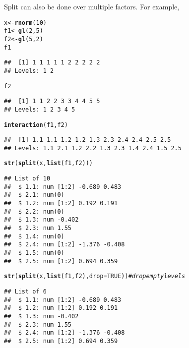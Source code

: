 \documentclass[12pt, a4paper, oneside]{article}\usepackage[]{graphicx}\usepackage[]{color}
\makeatletter
\newcommand{\hlnum}[1]{\textcolor[rgb]{0.686,0.059,0.569}{#1}}%
\newcommand{\hlcom}[1]{\textcolor[rgb]{0.678,0.584,0.686}{\textit{#1}}}%
\newcommand{\hlstd}[1]{\textcolor[rgb]{0.345,0.345,0.345}{#1}}%
\newcommand{\hlkwb}[1]{\textcolor[rgb]{0.69,0.353,0.396}{#1}}%
\newcommand{\hlkwc}[1]{\textcolor[rgb]{0.333,0.667,0.333}{#1}}%
\newcommand{\hlkwd}[1]{\textcolor[rgb]{0.737,0.353,0.396}{\textbf{#1}}}%
\newenvironment{kframe}{%
 \def\at@end@of@kframe{}%
 \ifinner\ifhmode%
  \def\at@end@of@kframe{\end{minipage}}%
  \begin{minipage}{\columnwidth}%
 \fi\fi%
 \def\FrameCommand##1{\hskip\@totalleftmargin \hskip-\fboxsep
 \colorbox{shadecolor}{##1}\hskip-\fboxsep
     \hskip-\linewidth \hskip-\@totalleftmargin \hskip\columnwidth}%
 \MakeFramed {\advance\hsize-\width
   \@totalleftmargin\z@ \linewidth\hsize
   \@setminipage}}%
 {\par\unskip\endMakeFramed%
 \at@end@of@kframe}
\newenvironment{knitrout}{}{} %
\makeatother
\begin{document}
Split can also be done over multiple factors.  For example, 
\begin{knitrout}
\color{fgcolor}\begin{kframe}
\begin{alltt}
\hlstd{x} \hlkwb{<-} \hlkwd{rnorm}\hlstd{(}\hlnum{10}\hlstd{)}
\hlstd{f1} \hlkwb{<-} \hlkwd{gl}\hlstd{(}\hlnum{2}\hlstd{,} \hlnum{5}\hlstd{)}
\hlstd{f2} \hlkwb{<-} \hlkwd{gl}\hlstd{(}\hlnum{5}\hlstd{,} \hlnum{2}\hlstd{)}
\hlstd{f1}
\end{alltt}
\begin{verbatim}
##  [1] 1 1 1 1 1 2 2 2 2 2
## Levels: 1 2
\end{verbatim}
\begin{alltt}
\hlstd{f2}
\end{alltt}
\begin{verbatim}
##  [1] 1 1 2 2 3 3 4 4 5 5
## Levels: 1 2 3 4 5
\end{verbatim}
\begin{alltt}
\hlkwd{interaction}\hlstd{(f1, f2)}
\end{alltt}
\begin{verbatim}
##  [1] 1.1 1.1 1.2 1.2 1.3 2.3 2.4 2.4 2.5 2.5
## Levels: 1.1 2.1 1.2 2.2 1.3 2.3 1.4 2.4 1.5 2.5
\end{verbatim}
\begin{alltt}
\hlkwd{str}\hlstd{(}\hlkwd{split}\hlstd{(x,} \hlkwd{list}\hlstd{(f1, f2)))}
\end{alltt}
\begin{verbatim}
## List of 10
##  $ 1.1: num [1:2] -0.689 0.483
##  $ 2.1: num(0) 
##  $ 1.2: num [1:2] 0.192 0.191
##  $ 2.2: num(0) 
##  $ 1.3: num -0.402
##  $ 2.3: num 1.55
##  $ 1.4: num(0) 
##  $ 2.4: num [1:2] -1.376 -0.408
##  $ 1.5: num(0) 
##  $ 2.5: num [1:2] 0.694 0.359
\end{verbatim}
\begin{alltt}
\hlkwd{str}\hlstd{(}\hlkwd{split}\hlstd{(x,} \hlkwd{list}\hlstd{(f1, f2),} \hlkwc{drop} \hlstd{=} \hlnum{TRUE}\hlstd{))}  \hlcom{# drop empty levels}
\end{alltt}
\begin{verbatim}
## List of 6
##  $ 1.1: num [1:2] -0.689 0.483
##  $ 1.2: num [1:2] 0.192 0.191
##  $ 1.3: num -0.402
##  $ 2.3: num 1.55
##  $ 2.4: num [1:2] -1.376 -0.408
##  $ 2.5: num [1:2] 0.694 0.359
\end{verbatim}
\end{kframe}
\end{knitrout}
\end{document}

